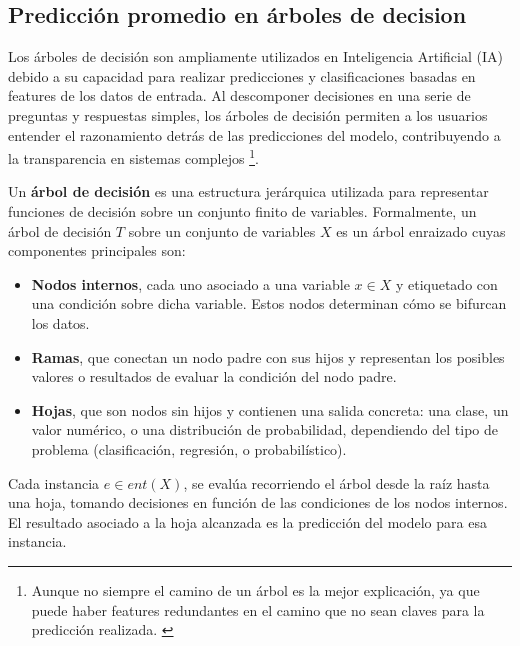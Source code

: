 
\subsection{Predicción promedio en árboles de decision}

Los árboles de decisión son ampliamente utilizados en Inteligencia Artificial (IA) debido a su capacidad para realizar predicciones y clasificaciones basadas en features de los datos de entrada. Al descomponer decisiones en una serie de preguntas y respuestas simples, los árboles de decisión permiten a los usuarios entender el razonamiento detrás de las predicciones del modelo, contribuyendo a la transparencia en sistemas complejos \footnote{Aunque no siempre el camino de un árbol es la mejor explicación, ya que puede haber features redundantes en el camino que no sean claves para la predicción realizada. \cite{audemard2021explanatorypowerdecisiontrees}}.

\begin{definition}
Un \textbf{árbol de decisión} es una estructura jerárquica utilizada para representar funciones de decisión sobre un conjunto finito de variables. Formalmente, un árbol de decisión \(T\) sobre un conjunto de variables \(X\) es un árbol enraizado cuyas componentes principales son:

\begin{itemize}
    \item \textbf{Nodos internos}, cada uno asociado a una variable \(x \in X\) y etiquetado con una condición sobre dicha variable. Estos nodos determinan cómo se bifurcan los datos.
    
    \item \textbf{Ramas}, que conectan un nodo padre con sus hijos y representan los posibles valores o resultados de evaluar la condición del nodo padre.
    
    \item \textbf{Hojas}, que son nodos sin hijos y contienen una salida concreta: una clase, un valor numérico, o una distribución de probabilidad, dependiendo del tipo de problema (clasificación, regresión, o probabilístico).
\end{itemize}

Cada instancia \(e \in ent(X)\), se evalúa recorriendo el árbol desde la raíz hasta una hoja, tomando decisiones en función de las condiciones de los nodos internos. El resultado asociado a la hoja alcanzada es la predicción del modelo para esa instancia.

\end{definition}

